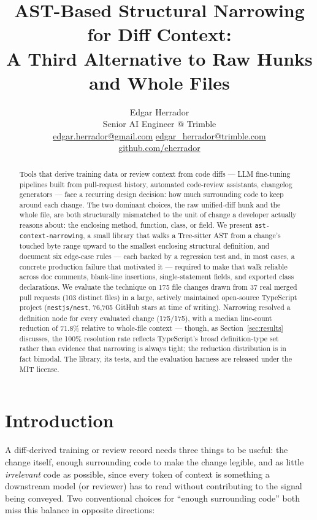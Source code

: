\documentclass[11pt]{article}
\title{AST-Based Structural Narrowing for Diff Context:\\
A Third Alternative to Raw Hunks and Whole Files}
\author{Edgar Herrador \\ Senior AI Engineer @ Trimble \\ \href{mailto:edgar.herrador@gmail.com}{edgar.herrador@gmail.com} \quad \href{mailto:edgar_herrador@trimble.com}{edgar\_herrador@trimble.com} \\ \href{https://github.com/eherrador}{github.com/eherrador}}
\date{}
\newcommand{\code}[1]{\texttt{#1}}
\begin{document}
\maketitle

\begin{abstract}
Tools that derive training data or review context from code diffs --- LLM
fine-tuning pipelines built from pull-request history, automated code-review
assistants, changelog generators --- face a recurring design decision: how much
surrounding code to keep around each change. The two dominant choices, the raw
unified-diff hunk and the whole file, are both structurally mismatched to the unit
of change a developer actually reasons about: the enclosing method, function,
class, or field. We present \code{ast-context-narrowing}, a small library that
walks a Tree-sitter AST from a change's touched byte range upward to the smallest
enclosing structural definition, and document six edge-case rules --- each backed
by a regression test and, in most cases, a concrete production failure that
motivated it --- required to make that walk reliable across doc comments,
blank-line insertions, single-statement fields, and exported class declarations.
We evaluate the technique on 175 file changes drawn from 37 real merged pull
requests (103 distinct files) in a large, actively maintained open-source
TypeScript project (\code{nestjs/nest}, 76{,}705 GitHub stars at time of writing).
Narrowing resolved a definition node for every evaluated change (175/175), with a
median line-count reduction of 71.8\% relative to whole-file context --- though,
as Section~\ref{sec:results} discusses, the 100\% resolution rate reflects
TypeScript's broad definition-type set rather than evidence that narrowing is
always tight; the reduction distribution is in fact bimodal. The library, its
tests, and the evaluation harness are released under the MIT license.
\end{abstract}

\section{Introduction}

A diff-derived training or review record needs three things to be useful: the
change itself, enough surrounding code to make the change legible, and as little
\emph{irrelevant} code as possible, since every token of context is something a
downstream model (or reviewer) has to read without contributing to the signal
being conveyed. Two conventional choices for ``enough surrounding code'' both miss
this balance in opposite directions:
\end{document}
